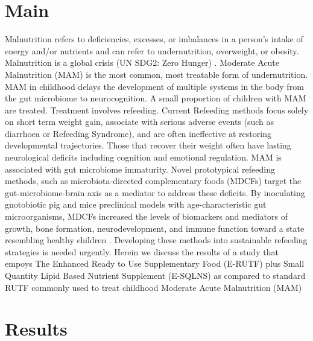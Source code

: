 \documentclass{article}
\begin{document}
\section{Main}
Malnutrition refers to deficiencies, excesses, or imbalances in a person’s intake of energy and/or nutrients and can refer to undernutrition, overweight, or obesity.
Malnutrition is a global crisis (UN SDG2: Zero Hunger) \cite{UN_SDG2}.
Moderate Acute Malnutrition (MAM) is the most common, most treatable form of undernutrition.
MAM in childhood delays the development of multiple systems in the body from the gut microbiome to neurocognition.
A small proportion of children with MAM are treated.
Treatment involves refeeding.
Current Refeeding methods focus solely on short term weight gain, associate with serious adverse events (such as diarrhoea or Refeeding Syndrome), and are often ineffective at restoring developmental trajectories.
Those that recover their weight often have lasting neurological deficits including cognition and emotional regulation.
MAM is associated with gut microbiome immaturity.
Novel prototypical refeeding methods, such as microbiota-directed complementary foods (MDCFs) target the gut-microbiome-brain axis as a mediator to address these deficits.
By inoculating gnotobiotic pig and mice preclinical models with age-characteristic gut microorganisms, MDCFs increased the levels of biomarkers and mediators of growth, bone formation, neurodevelopment, and immune function toward a state resembling healthy children \cite{gehrig2019effects}.
Developing these methods into sustainable refeeding strategies is needed urgently.
Herein we discuss the results of a study that empoys The Enhanced Ready to Use Supplementary Food (E-RUTF) plus Small Quantity Lipid Based Nutrient Supplement (E-SQLNS) as compared to standard RUTF commonly used to treat childhood Moderate Acute Malnutrition (MAM) 

\section{Results}
\end{document}
